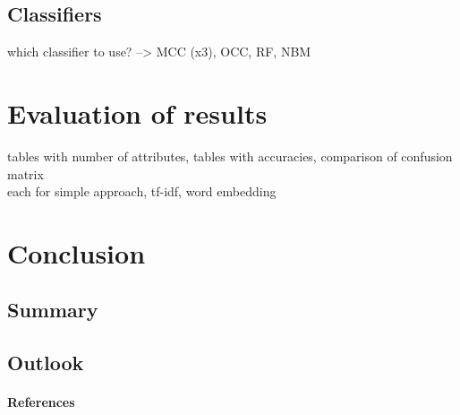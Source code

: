 \documentclass[article,type=msc,colorback,accentcolor=tud7b]{tudthesis}
\begin{document}
  \subsection{Classifiers}
    which classifier to use? --> MCC (x3), OCC, RF, NBM
  \clearpage  
  
  \section{Evaluation of results}
    tables with number of attributes, tables with accuracies, comparison of confusion matrix\\
    each for simple approach, tf-idf, word embedding
  \clearpage  
  
  \section{Conclusion}

  \subsection{Summary}

  \subsection{Outlook}
  \clearpage
  
  \paragraph{References}
  \printbibliography
  \clearpage
  
\end{document}
